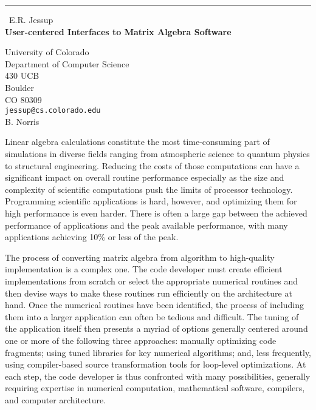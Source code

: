 \documentclass{report}
\begin{document}
\begin{center}
\rule{6in}{1pt} \
{\large E.R. Jessup \\
{\bf User-centered Interfaces to Matrix Algebra Software}}

University of Colorado \\ Department of Computer Science \\ 430 UCB \\ Boulder \\ CO 80309
\\
{\tt jessup@cs.colorado.edu}\\
B. Norris\end{center}

Linear algebra calculations constitute the most time-consuming part
of simulations in diverse fields ranging from atmospheric science to
quantum physics to structural engineering. Reducing the costs of those
computations can have a significant impact on overall routine performance
especially as the size and complexity of scientific computations push
the limits of processor technology. Programming scientific applications
is hard, however, and optimizing them for high performance is even
harder. There is often a large gap between the achieved performance of
applications and the peak available performance, with many applications
achieving 10\% or less of the peak.

The process of converting matrix algebra from algorithm to high-quality
implementation is a complex one. The code developer must create efficient
implementations from scratch or select the appropriate numerical
routines and then devise ways to make these routines run efficiently
on the architecture at hand. Once the numerical routines have been
identified, the process of including them into a larger application
can often be tedious and difficult. The tuning of the application
itself then presents a myriad of options generally centered around one
or more of the following three approaches: manually optimizing code
fragments; using tuned libraries for key numerical algorithms; and,
less frequently, using compiler-based source transformation tools for
loop-level optimizations. At each step, the code developer is thus
confronted with many possibilities, generally requiring expertise in
numerical computation, mathematical software, compilers, and computer
architecture.
\end{document}
